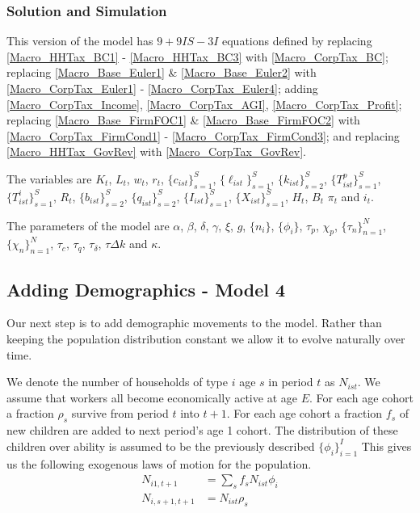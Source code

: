 \documentclass[letterpaper,12pt]{article}
\theoremstyle{definition}
\numberwithin{equation}{section}
\begin{document}
\begin{spacing}{1.5}
    \subsubsection{Solution and Simulation}
      This version of the model has $9+9IS-3I$ equations defined by replacing \eqref{Macro_HHTax_BC1} - \eqref{Macro_HHTax_BC3} with \eqref{Macro_CorpTax_BC}; replacing \eqref{Macro_Base_Euler1} \& \eqref{Macro_Base_Euler2} with \eqref{Macro_CorpTax_Euler1} - \eqref{Macro_CorpTax_Euler4}; adding \eqref{Macro_CorpTax_Income}, \eqref{Macro_CorpTax_AGI}, \eqref{Macro_CorpTax_Profit}; replacing \eqref{Macro_Base_FirmFOC1} \& \eqref{Macro_Base_FirmFOC2} with \eqref{Macro_CorpTax_FirmCond1} - \eqref{Macro_CorpTax_FirmCond3}; and replacing \eqref{Macro_HHTax_GovRev} with \eqref{Macro_CorpTax_GovRev}.  

      The variables are $K_t$, $L_t$, $w_t$, $r_t$, $\{c_{ist}\}_{s=1}^S$, $\{\ell_{ist}\}_{s=1}^S$, $\{k_{ist}\}_{s=2}^S$, $\{T^p_{ist}\}_{s=1}^S$, $\{T^i_{ist}\}_{s=1}^S$, $R_t$, $\{b_{ist}\}_{s=2}^S$, $\{q_{ist}\}_{s=2}^S$, $\{I_{ist}\}_{s=1}^S$, $\{X_{ist}\}_{s=1}^S$, $H_t$, $B_t$ $\pi_t$ and $i_t$.

      The parameters of the model are $\alpha$, $\beta$, $\delta$, $\gamma$, $\xi$, $g$, $\{n_i\}$, $\{\phi_i\}$, $\tau_p$, $\chi_p$, $\{\tau_n\}_{n=1}^N$, $\{\chi_n\}_{n=1}^N$, $\tau_c$, $\tau_q$, $\tau_\delta$, $\tau{\Delta k}$ and $\kappa$.

  \newpage

  \subsection{Adding Demographics - Model 4}\label{SubSec_Macro_Demog}
    Our next step is to add demographic movements to the model.  Rather than keeping the population distribution constant we allow it to evolve naturally over time.

    We denote the number of households of type $i$ age $s$ in period $t$ as $N_{ist}$.  We assume that workers all become economically active at age $E$.  For each age cohort a fraction $\rho_s$ survive from period $t$ into $t+1$.  For each age cohort a fraction $f_s$ of new children are added to next period's age 1 cohort.  The distribution of these children over ability is assumed to be the previously described $\{\phi_i\}_{i=1}^I$  This gives us the following exogenous laws of motion for the population.
    \begin{align}
    N_{i1,t+1} & = \sum_s f_s N_{ist} \phi_i \\
    N_{i,s+1,t+1} & = N_{ist} \rho_s
    \end{align}


\end{spacing}
\end{document}
